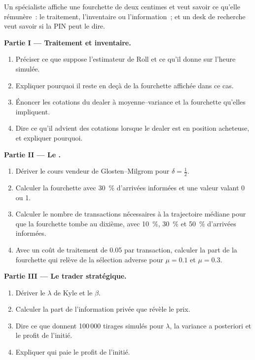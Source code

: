 \begin{problem}\label{pb:mx:why-there-is-a-spread:1}
Un spécialiste affiche une fourchette de deux centimes et veut savoir ce qu'elle rémunère~: le traitement, l'inventaire ou l'information~; et un desk de recherche veut savoir si
la PIN peut le dire.

\medskip\noindent\textbf{Partie I --- Traitement et inventaire.}
\begin{enumerate}
\item Préciser ce que suppose l'estimateur de Roll et ce qu'il donne sur l'heure simulée.
\item Expliquer pourquoi il reste en deçà de la fourchette affichée dans ce cas.
\item Énoncer les cotations du dealer à moyenne--variance et la fourchette qu'elles impliquent.
\item Dire ce qu'il advient des cotations lorsque le dealer est en position acheteuse, et expliquer pourquoi.
\end{enumerate}

\medskip\noindent\textbf{Partie II --- Le .}
\begin{enumerate}[resume]
\item Dériver le cours vendeur de Glosten--Milgrom pour $\delta=\tfrac12$.
\item Calculer la fourchette avec 30~\% d'arrivées informées et une valeur valant 0 ou 1.
\item Calculer le nombre de transactions nécessaires à la trajectoire médiane pour que la fourchette tombe au dixième, avec 10~\%, 30~\% et 50~\% d'arrivées informées.
\item Avec un coût de traitement de 0.05 par transaction, calculer la part de la fourchette qui relève de la sélection adverse pour $\mu=0.1$ et $\mu=0.3$.
\end{enumerate}

\medskip\noindent\textbf{Partie III --- Le trader stratégique.}
\begin{enumerate}[resume]
\item Dériver le $\lambda$ de Kyle et le $\beta$.
\item Calculer la part de l'information privée que révèle le prix.
\item Dire ce que donnent 100\,000 tirages simulés pour $\lambda$, la variance a posteriori et le profit de l'initié.
\item Expliquer qui paie le profit de l'initié.
\end{enumerate}


\end{problem}
